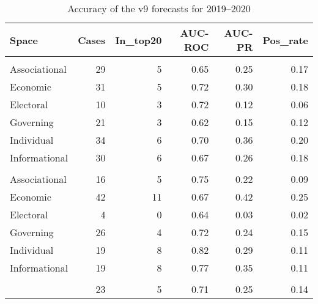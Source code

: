 \begin{table}

\caption{\label{tab:v9-acc}Accuracy of the v9 forecasts for 2019--2020}
\centering
\begin{tabular}[t]{lrrrrr}
\toprule
Space & Cases & In\_top20 & AUC-ROC & AUC-PR & Pos\_rate\\
\midrule
\addlinespace[0.3em]
\multicolumn{6}{l}{\textbf{Downards movement}}\\
\hspace{1em}Associational & 29 & 5 & 0.65 & 0.25 & 0.17\\
\hspace{1em}Economic & 31 & 5 & 0.72 & 0.30 & 0.18\\
\hspace{1em}Electoral & 10 & 3 & 0.72 & 0.12 & 0.06\\
\hspace{1em}Governing & 21 & 3 & 0.62 & 0.15 & 0.12\\
\hspace{1em}Individual & 34 & 6 & 0.70 & 0.36 & 0.20\\
\hspace{1em}Informational & 30 & 6 & 0.67 & 0.26 & 0.18\\
\addlinespace[0.3em]
\multicolumn{6}{l}{\textbf{Upwards movement}}\\
\hspace{1em}Associational & 16 & 5 & 0.75 & 0.22 & 0.09\\
\hspace{1em}Economic & 42 & 11 & 0.67 & 0.42 & 0.25\\
\hspace{1em}Electoral & 4 & 0 & 0.64 & 0.03 & 0.02\\
\hspace{1em}Governing & 26 & 4 & 0.72 & 0.24 & 0.15\\
\hspace{1em}Individual & 19 & 8 & 0.82 & 0.29 & 0.11\\
\hspace{1em}Informational & 19 & 8 & 0.77 & 0.35 & 0.11\\
\addlinespace[0.3em]
\multicolumn{6}{l}{\textbf{Average}}\\
\hspace{1em} & 23 & 5 & 0.71 & 0.25 & 0.14\\
\bottomrule
\end{tabular}
\end{table}
